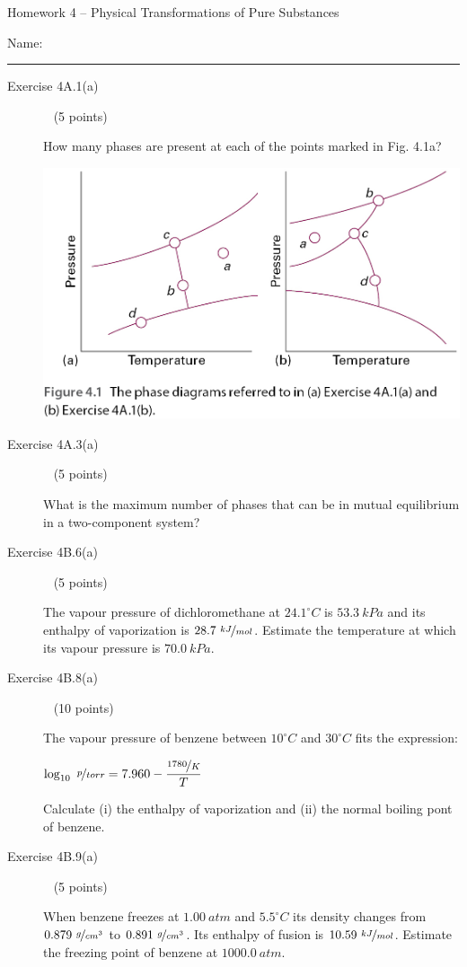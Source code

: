 \documentclass[12pt, openany, letterpaper]{memoir}
\begin{document}
\begin{center}
	{\large Homework 4 -- Physical Transformations of Pure Substances}
\end{center}

Name: \rule[-.1mm]{15em}{0.1pt}

\begin{description}
	\item [Exercise 4A.1(a)] ~ (5 points)

	      How many phases are present at each of the points marked in Fig. 4.1a?

	      \noindent\includegraphics[width=0.5\linewidth]{Phase_Diagrams}
	\item [Exercise 4A.3(a)] ~ (5 points)

	      What is the maximum number of phases that can be in mutual equilibrium in a two-component system?

	      \vspace{10em}
	\item [Exercise 4B.6(a)] ~ (5 points)

	      The vapour pressure of dichloromethane at $24.1^\circ C$ is $53.3~kPa$ and its enthalpy of vaporization is $28.7~\nicefrac{kJ}{mol}$. Estimate the temperature at which its vapour pressure is $70.0~kPa$.



	      \vspace{10em}
	\item [Exercise 4B.8(a)] ~ (10 points)

	      The vapour pressure of benzene between $10^\circ C$ and $30^\circ C$ fits the expression:

	      $\log_{10}~\nicefrac{p}{torr} = 7.960-\dfrac{\nicefrac{1780}{K}}{T}$

	      Calculate (i) the enthalpy of vaporization and (ii) the normal boiling pont of benzene.

	      \vspace{20em}
	\item [Exercise 4B.9(a)] ~ (5 points)

	      When benzene freezes at $1.00~atm$ and $5.5^\circ C$ its density changes from $0.879~\nicefrac{g}{cm^3}$ to $0.891~\nicefrac{g}{cm^3}$. Its enthalpy of fusion is $10.59~\nicefrac{kJ}{mol}$. Estimate the freezing point of benzene at $1000.0~atm$.

	      \vspace{15em}
\end{description}
\end{document}
